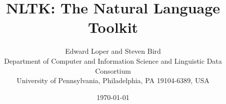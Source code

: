 \documentclass[11pt]{article}
\title{NLTK: The Natural Language Toolkit}
\author{
Edward Loper and Steven Bird\\
Department of Computer and Information Science and Linguistic Data Consortium\\
University of Pennsylvania, Philadelphia, PA 19104-6389, USA
}
\date{\today}
\begin{document}
\makeidpage
\maketitle


%
%
\end{document}
